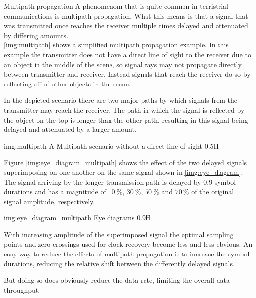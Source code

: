 \begin{subchapter}{Multipath propagation}
  A phenomenom that is quite common in terristrial communications
  is multipath propagation.
  What this means is that a signal that was transmitted once reaches the
  receiver multiple times delayed and attenuated by differing amounts. \\

  \autoref{img:multipath} shows a simplified multipath propagation example.
  In this example the transmitter does not have a direct line of
  sight to the receiver due to an object in the middle of the scene,
  so signal rays may not propagate directly between transmitter and receiver.
  Instead signals that reach the receiver do
  so by reflecting off of other objects in the scene.

  In the depicted scenario there are two major paths by which signals from
  the transmitter may reach the receiver.
  The path in which the signal is reflected by the object on
  the top is longer than the other path, resulting in this signal being
  delayed and attenuated by a larger amount.

               {img:multipath}
               {A Multipath scenario without a direct line of sight}
               {0.5}{H}

  Figure \ref{img:eye_diagram_multipath} shows the effect of the
  two delayed signals superimposing on one another on the same signal
  shown in \autoref{img:eye_diagram}.
  The signal arriving by the longer transmission path
  is delayed by $0.9$ symbol durations and has a magnitude
  of $\SI{10}{\percent}$, $\SI{30}{\percent}$, $\SI{50}{\percent}$ and
  $\SI{70}{\percent}$ of the original signal amplitude, respectively.

               {img:eye_diagram_multipath}
               {Eye diagrams}
               {0.9}{H}

  With increasing amplitude of the superimposed signal the optimal
  sampling points and zero crossings used for clock recovery
  become less and less obvious.
  An easy way to reduce the effects of multipath propagation is to
  increase the symbol durations, reducing the relative shift between
  the differently delayed signals.

  But doing so does obviously reduce the data rate,
  limiting the overall data throughput.
\end{subchapter}

